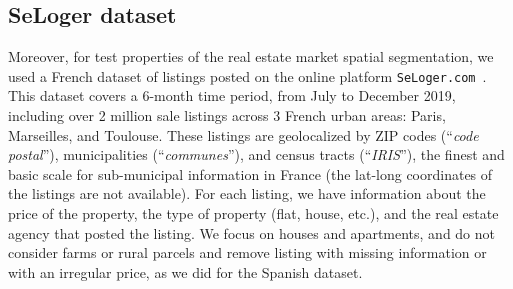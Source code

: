 \subsection{\label{subsec:SeLoger dataset} SeLoger dataset}

Moreover, for test properties of the real estate market spatial segmentation, we used a French dataset of listings posted on the online platform \texttt{SeLoger.com}~\cite{SeLoger}. This dataset covers a 6-month time period, from July to December 2019, including over 2 million sale listings across 3 French urban areas: Paris, Marseilles, and Toulouse. These listings are geolocalized by ZIP codes (``\textit{code postal}''), municipalities (``\textit{communes}''), and census tracts (``\textit{IRIS}''), the finest and basic scale for sub-municipal information in France (the lat-long coordinates of the listings are not available). For each listing, we have information about the price of the property, the type of property (flat, house, etc.), and the real estate agency that posted the listing. We focus on houses and apartments, and do not consider farms or rural parcels and remove listing with missing information or with an irregular price, as we did for the Spanish dataset.